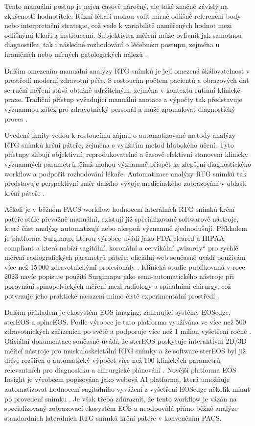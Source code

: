 \documentclass[male,czech,api_bc]{kitheses}
\begin{document}
Tento manuální postup je nejen časově náročný, ale také značně závislý na zkušenosti hodnotitele. Různí lékaři mohou volit mírně odlišné referenční body nebo interpretační strategie, což vede k variabilitě naměřených hodnot mezi odlišnými lékaři a institucemi. Subjektivita měření může ovlivnit jak samotnou diagnostiku, tak i následné rozhodování o léčebném postupu, zejména u hraničních nebo mírných patologických nálezů \cite{Ran2024}.

Dalším omezením manuální analýzy RTG snímků je její omezená škálovatelnost v prostředí moderní zdravotní péče. S rostoucím počtem pacientů a obrazových dat se ruční měření stává obtížně udržitelným, zejména v kontextu rutinní klinické praxe. Tradiční přístup
vyžadující manuální anotace a výpočty tak představuje významnou zátěž pro zdravotnický personál a může zpomalovat diagnostický proces \cite{Huang2025}.

Uvedené limity vedou k rostoucímu zájmu o automatizované metody analýzy RTG snímků krční páteře, zejména s využitím metod hlubokého učení. Tyto přístupy slibují objektivní, reprodukovatelné a časově efektivní stanovení klinicky významných parametrů, čímž mohou významně přispět ke zlepšení diagnostického workflow a podpořit rozhodování lékaře. Automatizace analýzy RTG snímků tak představuje perspektivní směr dalšího vývoje medicínského zobrazování v oblasti krční páteře \cite{Huang2025}.

Ačkoli je v běžném PACS workflow hodnocení laterálních RTG snímků krční páteře stále převážně manuální, existují již specializované softwarové nástroje, které část analýzy automatizují nebo alespoň významně zjednodušují. Příkladem je platforma Surgimap, kterou výrobce uvádí jako FDA-cleared a HIPAA-compliant a která nabízí sagitální, koronální a cervikální „wizardy“ pro rychlé měření radiografických parametrů páteře; oficiální web současně uvádí používání více než 15\,000 zdravotnickými profesionály \cite{SurgimapOfficial2026,SurgimapFeatures2026}. Klinická studie publikovaná v roce 2023 navíc popisuje použití Surgimapu jako semi-automatického nástroje při porovnání spinopelvických měření mezi radiology a spinálními chirurgy, což potvrzuje jeho praktické nasazení mimo čistě experimentální prostředí \cite{Fleiderman2023}.

Dalším příkladem je ekosystém EOS imaging, zahrnující systémy EOSedge, sterEOS a spineEOS. Podle výrobce je tato platforma využívána ve více než 500 zdravotnických zařízeních po světě a podporuje více než 1 milion vyšetření ročně \cite{EOSOfficial2026}. Oficiální dokumentace současně uvádí, že sterEOS poskytuje interaktivní 2D/3D měřicí nástroje pro muskuloskeletální RTG snímky a že software sterEOS byl již dříve rozšířen o automatický výpočet více než 100 klinických parametrů relevantních pro diagnostiku a chirurgické plánování \cite{EOSImagingSolutions2026,EOSFDA2014}. Novější platforma EOS Insight je výrobcem popisována jako webová AI platforma, která umožňuje automatizovat hodnocení sagitálního vyvážení z vyšetření EOSedge několik minut po provedení snímku \cite{EOSInsight2025}. Je však třeba zdůraznit, že tento workflow je vázán na specializovaný zobrazovací ekosystém EOS a neodpovídá přímo běžné analýze standardních laterálních RTG snímků krční páteře v konvenčním PACS.
\end{document}
